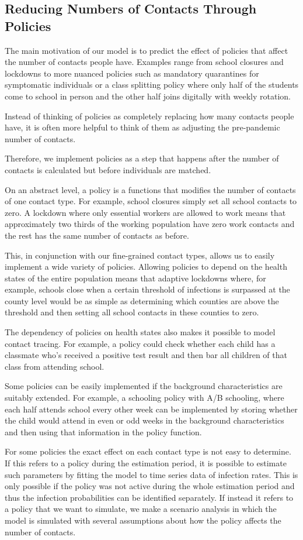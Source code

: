 \subsection{Reducing Numbers of Contacts Through Policies}
\label{sec:policies}

The main motivation of our model is to predict the effect of policies that affect the
number of contacts people have. Examples range from school closures and lockdowns to
more nuanced policies such as mandatory quarantines for symptomatic individuals or a
class splitting policy where only half of the students come to school in person and the
other half joins digitally with weekly rotation.

Instead of thinking of policies as completely replacing how many contacts people have,
it is often more helpful to think of them as adjusting the pre-pandemic number of
contacts.

Therefore, we implement policies as a step that happens after the number of contacts is
calculated but before individuals are matched.

On an abstract level, a policy is a functions that modifies the number of contacts of
one contact type. For example, school closures simply set all school contacts to zero. A
lockdown where only essential workers are allowed to work means that approximately two
thirds of the working population have zero work contacts and the rest has the same
number of contacts as before.

This, in conjunction with our fine-grained contact types, allows us to easily implement
a wide variety of policies. Allowing policies to depend on the health states of the
entire population means that adaptive lockdowns where, for example, schools close when a
certain threshold of infections is surpassed at the county level would be as simple as
determining which counties are above the threshold and then setting all school contacts
in these counties to zero.

The dependency of policies on health states also makes it possible to model contact
tracing. For example, a policy could check whether each child has a classmate who's
received a positive test result and then bar all children of that class from attending
school.

Some policies can be easily implemented if the background characteristics are suitably
extended. For example, a schooling policy with A/B schooling, where each half attends
school every other week can be implemented by storing whether the child would attend in
even or odd weeks in the background characteristics and then using that information in
the policy function.

For some policies the exact effect on each contact type is not easy to determine. If
this refers to a policy during the estimation period, it is possible to estimate such
parameters by fitting the model to time series data of infection rates. This is only
possible if the policy was not active during the whole estimation period and thus the
infection probabilities can be identified separately. If instead it refers to a policy
that we want to simulate, we make a scenario analysis in which the model is simulated
with several assumptions about how the policy affects the number of contacts.
